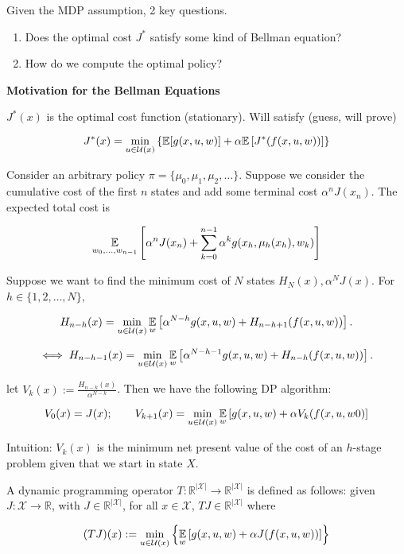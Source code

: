 Given the MDP assumption, 2 key questions.

\begin{enumerate}

\item Does the optimal cost \(J^*\) satisfy some kind of Bellman equation?

\item How do we compute the optimal policy?

\end{enumerate}

\textbf{Motivation for the Bellman Equations}

\(J^*(x)\) is the optimal cost function (stationary). Will satisfy (guess, will prove)

\[
J^*(x) = \min_{u \in \mathcal{U}(x)} \left\{ \mathbb{E}[g(x,u,w) ] + \alpha \mathbb{E} \left[ J^*(f(x,u,w)) \right] \right\}
\]

Consider an arbitrary policy \(\pi = \{\mu_0, \mu_1, \mu_2, \ldots\}\). Suppose we consider the cumulative cost of the first \(n\) states and add some terminal cost \(\alpha^n J(x_n)\). The expected total cost is 

\[
\underset{w_0, \ldots, w_{n-1}}{\mathbb{E}} \left[ \alpha^n J(x_n) + \sum_{k=0}^{n-1} \alpha^k g(x_h, \mu_h(x_h), w_k) \right]
\]

Suppose we want to find the minimum cost of \(N\) states \(H_N(x), \alpha^N J(x)\). For \(h \in \{1, 2, \ldots, N\}\),

\[
H_{n-h}(x) = \min_{u \in \mathcal{U}(x)} \underset{w}{\mathbb{E}} \left[ \alpha^{N-h} g(x, u, w) + H_{n-h+1}(f(x,u,w)) \right].
\]

\[
\iff H_{n-h-1}(x) = \min_{u \in \mathcal{U}(x)} \underset{w}{\mathbb{E}} \left[ \alpha^{N-h-1} g(x, u, w) + H_{n-h}(f(x,u,w)) \right].
\]

let \(V_k(x) := \frac{H_{n-k}(x)}{\alpha^{N-k}}\). Then we have the following DP algorithm:

\[
V_0(x) = J(x); \qquad V_{k+1}(x) = \min_{u \in \mathcal{U}(x)} \underset{w}{\mathbb{E}} \left[ g(x, u, w) + \alpha V_k(f(x,u,w0)\right] 
\]

Intuition: \(V_k(x)\) is the minimum net present value of the cost of an \(h\)-stage problem given that we start in state \(X\). 

\begin{definition}

A dynamic programming operator \(T: \mathbb{R}^{|\mathcal{X}|} \to \mathbb{R}^{|\mathcal{X}|}\) is defined as follows: given \(J: \mathcal{X} \to \mathbb{R}\), with \(J \in \mathbb{R}^{|\mathcal{X}|}\), for all \(x \in \mathcal{X}\), \(TJ \in \mathbb{R}^{|\mathcal{X}|}\) where

\[
(TJ)(x) := \min_{u \in \mathcal{U}(x)} \left\{ \underset{w}{\mathbb{E}} \left[ g(x,u,w) + \alpha J(f(x,u,w)) \right] \right\}
\]

\end{definition}

